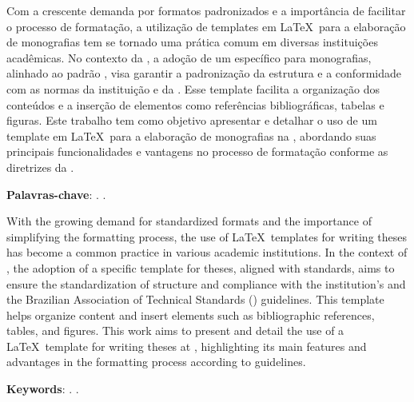 \setlength{\absparsep}{18pt} %

\begin{resumo}
  Com a crescente demanda por formatos padronizados e a importância de facilitar o processo de formatação, a utilização de templates em \LaTeX\ para a elaboração de monografias tem se tornado uma prática comum em diversas instituições acadêmicas.
  No contexto da \ufma, a adoção de um \template{} específico para monografias, alinhado ao padrão \abnt, visa garantir a padronização da estrutura e a conformidade com as normas da instituição e da \abntfull.
  Esse template facilita a organização dos conteúdos e a inserção de elementos como referências bibliográficas, tabelas e figuras.
  Este trabalho tem como objetivo apresentar e detalhar o uso de um template em \LaTeX\ para a elaboração de monografias na \ufma, abordando suas principais funcionalidades e vantagens no processo de formatação conforme as diretrizes da \abnt.

  \textbf{Palavras-chave}: \abnt. \ufma.
\end{resumo}

\begin{resumo}[Abstract]
  With the growing demand for standardized formats and the importance of simplifying the formatting process, the use of \LaTeX\ templates for writing theses has become a common practice in various academic institutions.
  In the context of \ufma, the adoption of a specific template for theses, aligned with \abnt standards, aims to ensure the standardization of structure and compliance with the institution's and the Brazilian Association of Technical Standards (\abnt) guidelines.
  This template helps organize content and insert elements such as bibliographic references, tables, and figures.
  This work aims to present and detail the use of a \LaTeX\ template for writing theses at \ufma, highlighting its main features and advantages in the formatting process according to \abnt guidelines.

  \textbf{Keywords}: \abnt. \ufma.
\end{resumo}

